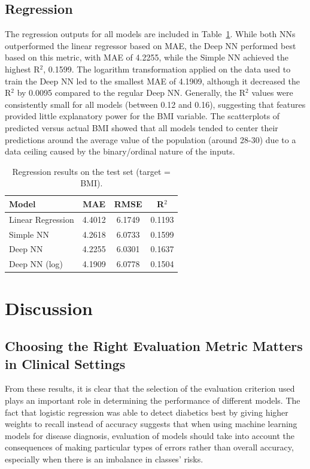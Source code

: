 \documentclass{article}
\begin{document}
\subsection{Regression}

The regression outputs for all models are included in Table~\ref{tab:reg}. While both NNs outperformed the linear regressor based on MAE, the Deep NN performed best based on this metric, with MAE of 4.2255, while the Simple NN achieved the highest R$^2$, 0.1599. The logarithm transformation applied on the data used to train the Deep NN led to the smallest MAE of 4.1909, although it decreased the R$^2$ by 0.0095 compared to the regular Deep NN. Generally, the R$^2$ values were consistently small for all models (between 0.12 and 0.16), suggesting that features provided little explanatory power for the BMI variable. The scatterplots of predicted versus actual BMI showed that all models tended to center their predictions around the average value of the population (around 28-30) due to a data ceiling caused by the binary/ordinal nature of the inputs.

\begin{table}[h]
  \caption{Regression results on the test set (target = BMI).}
  \label{tab:reg}
  \centering
  \begin{tabular}{lccc}
    \toprule
    Model & MAE & RMSE & R$^2$ \\
    \midrule
    Linear Regression & 4.4012 & 6.1749 & 0.1193 \\
    Simple NN         & 4.2618 & 6.0733 & 0.1599 \\
    Deep NN           & 4.2255 & 6.0301 & 0.1637 \\
    Deep NN (log)     & 4.1909 & 6.0778 & 0.1504 \\
    \bottomrule
  \end{tabular}
\end{table}

\section{Discussion}

\subsection{Choosing the Right Evaluation Metric Matters in Clinical Settings}

From these results, it is clear that the selection of the evaluation criterion used plays an important role in determining the performance of different models. The fact that logistic regression was able to detect diabetics best by giving higher weights to recall instead of accuracy suggests that when using machine learning models for disease diagnosis, evaluation of models should take into account the consequences of making particular types of errors rather than overall accuracy, especially when there is an imbalance in classes' risks.
\end{document}
